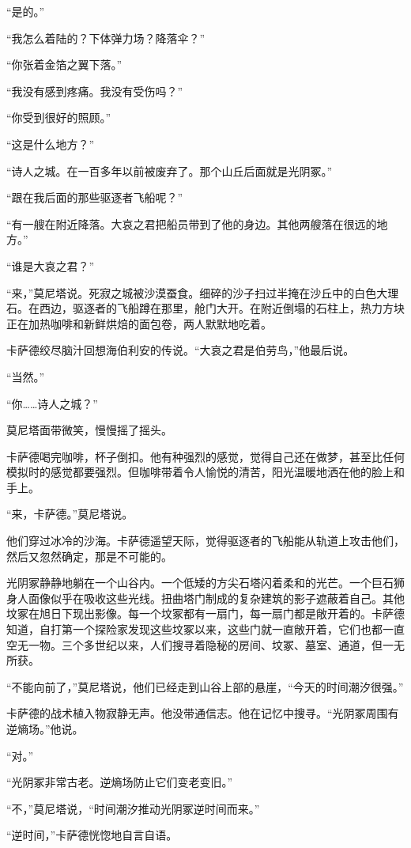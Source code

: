 \documentclass[AutoFakeBold=true]{book}
\begin{document}
``是的。''

``我怎么着陆的？下体弹力场？降落伞？''

``你张着金箔之翼下落。''

``我没有感到疼痛。我没有受伤吗？''

``你受到很好的照顾。''

``这是什么地方？''

``诗人之城。在一百多年以前被废弃了。那个山丘后面就是光阴冢。''

``跟在我后面的那些驱逐者飞船呢？''

``有一艘在附近降落。大哀之君把船员带到了他的身边。其他两艘落在很远的地方。''

``谁是大哀之君？''

``来，''莫尼塔说。死寂之城被沙漠蚕食。细碎的沙子扫过半掩在沙丘中的白色大理石。在西边，驱逐者的飞船蹲在那里，舱门大开。在附近倒塌的石柱上，热力方块正在加热咖啡和新鲜烘焙的面包卷，两人默默地吃着。

卡萨德绞尽脑汁回想海伯利安的传说。``大哀之君是伯劳鸟，''他最后说。

``当然。''

``你……诗人之城？''

莫尼塔面带微笑，慢慢摇了摇头。

卡萨德喝完咖啡，杯子倒扣。他有种强烈的感觉，觉得自己还在做梦，甚至比任何模拟时的感觉都要强烈。但咖啡带着令人愉悦的清苦，阳光温暖地洒在他的脸上和手上。

``来，卡萨德。''莫尼塔说。

他们穿过冰冷的沙海。卡萨德遥望天际，觉得驱逐者的飞船能从轨道上攻击他们，然后又忽然确定，那是不可能的。

光阴冢静静地躺在一个山谷内。一个低矮的方尖石塔闪着柔和的光芒。一个巨石狮身人面像似乎在吸收这些光线。扭曲塔门制成的复杂建筑的影子遮蔽着自己。其他坟冢在旭日下现出影像。每一个坟冢都有一扇门，每一扇门都是敞开着的。卡萨德知道，自打第一个探险家发现这些坟冢以来，这些门就一直敞开着，它们也都一直空无一物。三个多世纪以来，人们搜寻着隐秘的房间、坟冢、墓室、通道，但一无所获。

``不能向前了，''莫尼塔说，他们已经走到山谷上部的悬崖，``今天的时间潮汐很强。''

卡萨德的战术植入物寂静无声。他没带通信志。他在记忆中搜寻。``光阴冢周围有逆熵场。''他说。

``对。''

``光阴冢非常古老。逆熵场防止它们变老变旧。''

``不，''莫尼塔说，``时间潮汐推动光阴冢逆时间而来。''

``逆时间，''卡萨德恍惚地自言自语。
\end{document}
